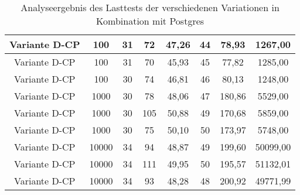 \begin{anhang}
\begin{landscape}
\begin{table}[h!]
\begin{tabular}{ |c|c|c|c|c|c|c|c|}
			\hline
			Variante D-CP & 100 & 31 & 72 & 47,26 & 44 & 78,93 & 1267,00 \\
			\hline
			Variante D-CP & 100 & 31 & 70 & 45,93 & 45 & 77,82 & 1285,00 \\
			\hline
			Variante D-CP & 100 & 30 & 74 & 46,81 & 46 & 80,13 & 1248,00 \\
			\hline
			Variante D-CP & 1000 & 30 & 78 & 48,06 & 47 & 180,86 & 5529,00 \\
			\hline
			Variante D-CP & 1000 & 30 & 105 & 50,88 & 49 & 170,68 & 5859,00 \\
			\hline
			Variante D-CP & 1000 & 30 & 75 & 50,10 & 50 & 173,97 & 5748,00 \\
			\hline
			Variante D-CP & 10000 & 34 & 94 & 48,87 & 49 & 199,60 & 50099,00 \\
			\hline
			Variante D-CP & 10000 & 34 & 111 & 49,95 & 50 & 195,57 & 51132,01 \\
			\hline
			Variante D-CP & 10000 & 34 & 93 & 48,28 & 48 & 200,92 & 49771,99 \\
			\hline
		\end{tabular}
		\caption{Analyseergebnis des Lasttests der verschiedenen Variationen in Kombination mit Postgres}
		\label{fig:performance-postgres}
	\end{table}
\end{landscape}


\end{anhang}
